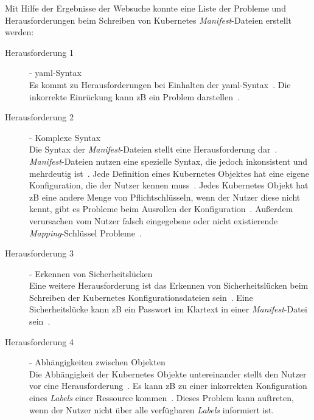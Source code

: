 Mit Hilfe der Ergebnisse der Websuche konnte eine Liste der Probleme und Herausforderungen beim Schreiben von Kubernetes \textit{Manifest}-Dateien erstellt werden:
\begin{description}
  \item[Herausforderung 1]{- \ac{yaml}-Syntax\\}
        Es kommt zu Herausforderungen bei Einhalten der \ac{yaml}-Syntax~\cite{10.1145/3357223.3365759,the-chief-io-kubernetes-challenges,techtarget-kubernetes-challenges,monokle-kubernetes-challenges}.
        Die inkorrekte Einrückung kann \ac{zB} ein Problem darstellen~\cite{10.1145/3357223.3365759,monokle-kubernetes-challenges}.
  \item[Herausforderung 2]{- Komplexe Syntax\\}
        Die Syntax der \textit{Manifest}-Dateien stellt eine Herausforderung dar~\cite{dev-to-kubernetes-challenges,kubetools-io-kubernetes-manifest-management,entwickler-de-kubernetes-problems,newstack-io-kubernetes-manifest-lifecycle,10.1145/3357223.3365759,techtarget-kubernetes-challenges,monokle-kubernetes-challenges,kubernetes-config-problems}.
        \textit{Manifest}-Dateien nutzen eine spezielle Syntax, die jedoch inkonsistent und mehrdeutig ist~\cite{dev-to-kubernetes-challenges}.
        Jede Definition eines Kubernetes Objektes hat eine eigene Konfiguration, die der Nutzer kennen muss~\cite{kubetools-io-kubernetes-manifest-management,entwickler-de-kubernetes-problems}.
        Jedes Kubernetes Objekt hat \ac{zB} eine andere Menge von Pflichtschlüsseln, wenn der Nutzer diese nicht kennt, gibt es Probleme beim Ausrollen der Konfiguration~\cite{10.1145/3357223.3365759, techtarget-kubernetes-challenges}.
        Außerdem verursachen vom Nutzer falsch eingegebene oder nicht existierende \textit{Mapping}-Schlüssel Probleme~\cite{monokle-kubernetes-challenges}.
  \item[Herausforderung 3]{- Erkennen von Sicherheitslücken\\}
        Eine weitere Herausforderung ist das Erkennen von Sicherheitslücken beim Schreiben der Kubernetes Konfigurationsdateien sein~\cite{9476056,dynatrace-kubernetes-security-challenges,10.1145/3468264.3473495,10.1145/3579639}.
        Eine Sicherheitslücke kann \ac{zB} ein Passwort im Klartext in einer \textit{Manifest}-Datei sein~\cite{10.1145/3579639}.
  \item[Herausforderung 4]{- Abhängigkeiten zwischen Objekten\\}
        Die Abhängigkeit der Kubernetes Objekte untereinander stellt den Nutzer vor eine Herausforderung~\cite{dev-to-kubernetes-challenges,kubetools-io-kubernetes-manifest-management,spacelift-io-kubernetes-challenges,qovery-kubernetes-challenges}.
        Es kann \ac{zB} zu einer inkorrekten Konfiguration eines \textit{Labels} einer Ressource kommen~\cite{spacelift-io-kubernetes-challenges,qovery-kubernetes-challenges}.
        Dieses Problem kann auftreten, wenn der Nutzer nicht über alle verfügbaren \textit{Labels} informiert ist.
\end{description}

